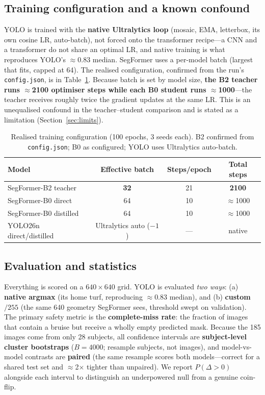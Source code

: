 \documentclass[11pt]{article}
\newcommand{\best}[1]{\textbf{#1}}
\begin{document}
\subsection{Training configuration and a known confound}
YOLO is trained with the \textbf{native Ultralytics loop} (mosaic, EMA,
letterbox, its own cosine LR, auto-batch), not forced onto the transformer
recipe---a CNN and a transformer do not share an optimal LR, and native training
is what reproduces YOLO's $\approx$0.83 median. SegFormer uses a per-model batch
(largest that fits, capped at 64). The realised configuration, confirmed from the
run's \texttt{config.json}, is in Table~\ref{tab:batch}. Because batch is set by
model size, \textbf{the B2 teacher runs $\approx$2100 optimiser steps while each
B0 student runs $\approx$1000}---the teacher receives roughly twice the gradient
updates at the same LR. This is an unequalised confound in the teacher--student
comparison and is stated as a limitation (Section~\ref{sec:limits}).

\begin{table}[h]
\centering
\caption{Realised training configuration (100 epochs, 3 seeds each).
B2 confirmed from \texttt{config.json}; B0 as configured; YOLO uses Ultralytics
auto-batch.}
\label{tab:batch}
\begin{tabular}{lccc}
\toprule
Model & Effective batch & Steps/epoch & Total steps \\
\midrule
SegFormer-B2 teacher      & \best{32} & 21 & \best{2100} \\
SegFormer-B0 direct       & 64 & 10 & $\approx$1000 \\
SegFormer-B0 distilled    & 64 & 10 & $\approx$1000 \\
YOLO26n direct/distilled  & Ultralytics auto ($-1$) & --- & native \\
\bottomrule
\end{tabular}
\end{table}

\subsection{Evaluation and statistics}
Everything is scored on a $640\times640$ grid. YOLO is evaluated \emph{two ways}:
(a) \textbf{native argmax} (its home turf, reproducing $\approx$0.83 median), and
(b) \textbf{custom $/255$} (the same 640 geometry SegFormer sees, threshold swept
on validation). The primary safety metric is the \textbf{complete-miss rate}: the
fraction of images that contain a bruise but receive a wholly empty predicted
mask. Because the 185 images come from only 28 subjects, all confidence intervals
are \textbf{subject-level cluster bootstraps} ($B=4000$; resample subjects, not
images), and model-vs-model contrasts are \textbf{paired} (the same resample
scores both models---correct for a shared test set and $\approx$2$\times$ tighter
than unpaired). We report $P(\Delta{>}0)$ alongside each interval to distinguish
an underpowered null from a genuine coin-flip.
\end{document}
